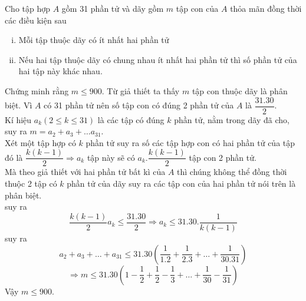 \begin{ex}%
Cho tập hợp $A$ gồm 31 phần tử và dãy gồm $m$ tập con của $A$ thỏa mãn đồng thời các điều kiện sau
\begin{enumerate}[i)]  
\item Mỗi tập thuộc dãy có ít nhất hai phần tử
\item Nếu hai tập thuộc dãy có chung nhau ít nhất hai phần tử thì số phần tử của hai tập này khác nhau.

\end{enumerate}
Chứng minh rằng $m\leq 900$.
\loigiai
{
Từ giả thiết ta thấy $m$ tập con thuộc dãy là phân biệt. Vì $A$ có 31 phần tử nên số tập con có đúng 2 phần tử của $A$ là $\dfrac{31.30}{2}$.\\
Kí hiệu $a_k (2\leq k\leq 31)$ là các tập có đúng $k$ phần tử, nằm trong dãy đã cho, suy ra $m = a_2+a_3+\ldots a_{31}$.\\
 Xét một tập hợp có $k$ phần tử suy ra số các tập hợp con có hai phần tử của tập đó là $\dfrac{k(k-1)}{2}\Rightarrow a_k$ tập này sẽ có $a_k.\dfrac{k(k-1)}{2}$ tập con 2 phần tử.\\
  Mà theo giả thiết với hai phần tử bất kì của $A$ thì chúng không thể đồng thời thuộc 2 tập có $k$ phần tử của dãy suy ra các tập con của hai phần tử nói trên là phân biệt.\\
suy ra $$\dfrac{k(k-1)}{2}a_k\leq \dfrac{31.30}{2}\Rightarrow a_k \leq 31.30.\dfrac{1}{k(k-1)}$$
suy ra $$a_2+a_3+\ldots+a_{31}\leq 31.30\left(\dfrac{1}{1.2}+\dfrac{1}{2.3}+\ldots+\dfrac{1}{30.31}\right)$$
$$\Rightarrow m\leq 31.30\left(1-\dfrac{1}{2}+\dfrac{1}{2}-\dfrac{1}{3}+\ldots+\dfrac{1}{30}-\dfrac{1}{31}\right)$$
Vậy $m \leq 900$.
}
\end{ex}


